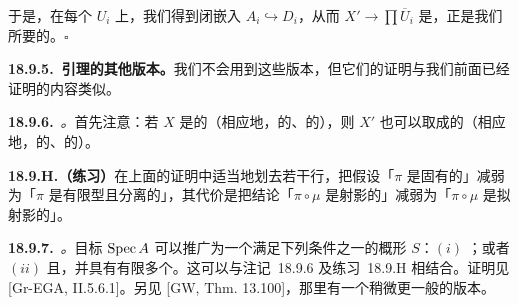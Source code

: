 于是，在每个 $U_i$ 上，我们得到闭嵌入 $A_i\hookrightarrow D_i$，从而 $X'\to\prod\overline{U}_i$ 是\trLocallyClosedEmbedding，正是我们所要的。\hfill$\square$

\textbf{18.9.5.\ \trChow{}引理的其他版本。}\quad 我们不会用到这些版本，但它们的证明与我们前面已经证明的内容类似。

\textbf{18.9.6.}\ \emph{\trhRemark。}\quad 首先注意：若 $X$ 是\trReduced{}的（相应地，\trIrreducible{}的、\trIntegral{}的），则 $X'$ 也可以取成\trReduced{}的（相应地，\trIrreducible{}的、\trIntegral{}的）。

\textbf{18.9.H.（练习）}\quad 在上面的证明中适当地划去若干行，把假设「$\pi$ 是固有的」减弱为「$\pi$ 是有限型且分离的」，其代价是把结论「$\pi\circ\mu$ 是射影的」减弱为「$\pi\circ\mu$ 是拟射影的」。

\textbf{18.9.7.}\ \emph{\trhRemark。}\quad 目标 $\operatorname{Spec} A$ 可以推广为一个满足下列条件之一的概形 $S$：$(i)$ \trNoetherian；或者 $(ii)$ \trSeparated{}且\trQuasicompact{}，并具有有限多个\trIrreducibleComponent{}。这可以与\mbox{注记~18.9.6} 及\mbox{练习~18.9.H} 相结合。证明见 [Gr-EGA, II.5.6.1]。另见 [GW, Thm. 13.100]，那里有一个稍微更一般的版本。
